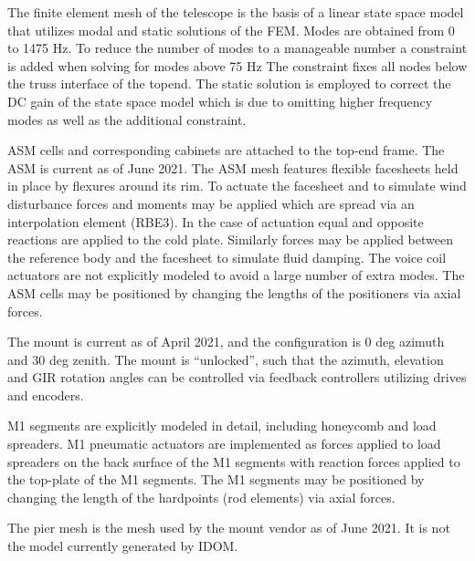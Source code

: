 

The finite element mesh of the telescope is the basis of a linear state space model that utilizes modal and static solutions of the FEM. Modes are obtained from 0 to 1475 Hz. 
To reduce the number of modes to a manageable number a constraint is added when solving for modes above 75 Hz The constraint fixes all nodes below the truss interface of the topend. 
The static solution is employed to correct the DC gain of the state space model which is due to omitting higher frequency modes as well as the additional constraint.

ASM cells and corresponding cabinets are attached to the top-end frame. 
The ASM is current as of June 2021.
The ASM mesh features flexible facesheets held in place by flexures around its rim. 
To actuate the facesheet and to simulate wind disturbance forces and moments may be applied which are spread via an interpolation element (RBE3). 
In the case of actuation equal and opposite reactions are applied to the cold plate. Similarly forces may be applied between the reference body and the facesheet to simulate fluid damping. The voice coil actuators are not explicitly modeled to avoid a large number of extra modes. 
The ASM cells may be positioned by changing the lengths of the positioners via axial forces.

The mount is current as of April 2021, and the configuration is 0 deg azimuth and 30 deg zenith. 
The mount is ``unlocked'', such that the  azimuth, elevation and GIR rotation angles can be controlled via feedback controllers utilizing drives and encoders.
 
M1 segments are explicitly modeled in detail, including honeycomb and load spreaders. 
M1 pneumatic actuators are implemented as forces applied to load spreaders on the back surface of the M1 segments with reaction forces applied to the top-plate of the M1 segments. 
The M1 segments may be positioned by changing the length of the hardpoints (rod elements) via axial forces.

The pier mesh is the mesh used by the mount vendor as of June 2021. It is not the model currently generated by IDOM.

